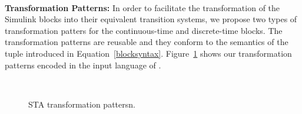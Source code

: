\noindent\\ \textbf{Transformation Patterns: } In order to facilitate the transformation of the Simulink blocks into their equivalent transition systems, we propose two types of transformation patters for the continuous-time and discrete-time blocks. The transformation patterns are reusable and they conform to the semantics of the tuple introduced in Equation~\ref{blocksyntax}. Figure~\ref{fig_patterns} shows our transformation patterns encoded in the input language of \uppaalsmc.
\begin{figure}[] 
	\centering
	 ~
	\caption{STA transformation pattersn.} 
	\label{fig_patterns}
\end{figure}

